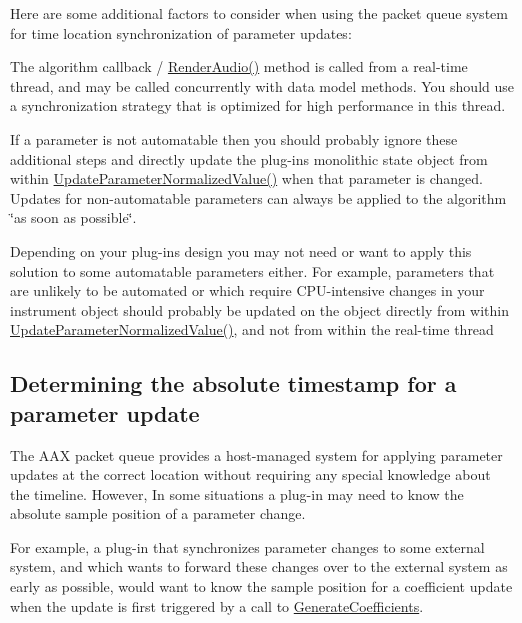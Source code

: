 Here are some additional factors to consider when using the packet queue system for time location synchronization of parameter updates\+: \begin{DoxyItemize}
\item The algorithm callback / \mbox{\hyperlink{a01969_a04f2f73d70ea28c17747c68fc3a20fc8}{Render\+Audio()}} method is called from a real-\/time thread, and may be called concurrently with data model methods. You should use a synchronization strategy that is optimized for high performance in this thread. \item If a parameter is not automatable then you should probably ignore these additional steps and directly update the plug-\/in\textquotesingle{}s monolithic state object from within \mbox{\hyperlink{a01669_a685858711efb8634ce66c327f2865c71}{Update\+Parameter\+Normalized\+Value()}} when that parameter is changed. Updates for non-\/automatable parameters can always be applied to the algorithm \char`\"{}as soon as possible\char`\"{}. \item Depending on your plug-\/in\textquotesingle{}s design you may not need or want to apply this solution to some automatable parameters either. For example, parameters that are unlikely to be automated or which require C\+P\+U-\/intensive changes in your instrument object should probably be updated on the object directly from within \mbox{\hyperlink{a01669_a685858711efb8634ce66c327f2865c71}{Update\+Parameter\+Normalized\+Value()}}, and not from within the real-\/time thread\end{DoxyItemize}
\hypertarget{a00821_parameterUpdateTiming_timestamps}{}\subsection{Determining the absolute timestamp for a parameter update}\label{a00821_parameterUpdateTiming_timestamps}
The A\+AX packet queue provides a host-\/managed system for applying parameter updates at the correct location without requiring any special knowledge about the timeline. However, In some situations a plug-\/in may need to know the absolute sample position of a parameter change.

For example, a plug-\/in that synchronizes parameter changes to some external system, and which wants to forward these changes over to the external system as early as possible, would want to know the sample position for a coefficient update when the update is first triggered by a call to \mbox{\hyperlink{a01669_a083265b008921b6114ede387711694b7}{Generate\+Coefficients}}.

